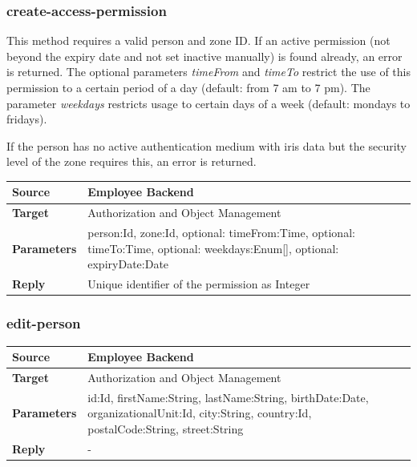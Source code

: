 \documentclass[12pt,a4paper,titlepage,oneside]{scrartcl}
\begin{document}
\subsubsection{create-access-permission}

This method requires a valid person and zone ID. If an active permission (not beyond the expiry date and not set inactive manually) is found already, an error is returned. The optional parameters \emph{timeFrom} and \emph{timeTo} restrict the use of this permission to a certain period of a day (default: from 7 am to 7 pm). The parameter \emph{weekdays} restricts usage to certain days of a week (default: mondays to fridays).

If the person has no active authentication medium with iris data but the security level of the zone requires this, an error is returned.

\begin{table}[h]

    \centering

    \begin{tabular}{|l|p{12cm}|} \hline

    \textbf{Source}&Employee Backend\\ \hline

    \textbf{Target}&Authorization and Object Management\\ \hline

    \textbf{Parameters}&person:Id, zone:Id, optional: timeFrom:Time, optional: timeTo:Time, optional: weekdays:Enum[], optional: expiryDate:Date\\ \hline

    \textbf{Reply}&Unique identifier of the permission as Integer\\ \hline

    \end{tabular}

\end{table}

\subsubsection{edit-person}

\begin{table}[h]

    \centering

    \begin{tabular}{|l|p{12cm}|} \hline

    \textbf{Source}&Employee Backend\\ \hline

    \textbf{Target}&Authorization and Object Management\\ \hline

    \textbf{Parameters}&id:Id, firstName:String, lastName:String, birthDate:Date, organizationalUnit:Id, city:String, country:Id, postalCode:String, street:String\\ \hline

    \textbf{Reply}&-\\ \hline

    \end{tabular}

\end{table}
\end{document}
